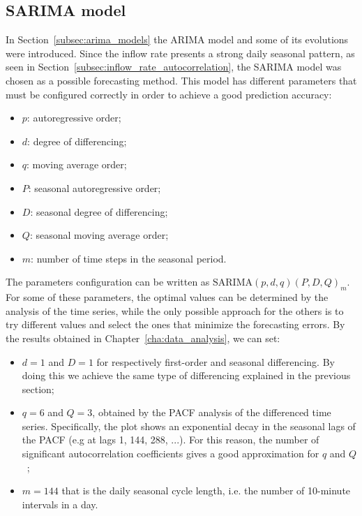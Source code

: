 \subsection{SARIMA model}
\label{subsec:sarima_model}
In Section~\ref{subsec:arima_models} the ARIMA model and some of its evolutions were introduced. Since the inflow rate presents a strong daily seasonal pattern, as seen in Section~\ref{subsec:inflow_rate_autocorrelation}, the SARIMA model was chosen as a possible forecasting method. This model has different parameters that must be configured correctly in order to achieve a good prediction accuracy:
\begin{itemize}
  \item \( p \): autoregressive order;
  \item \( d \): degree of differencing;
  \item \( q \): moving average order;
  \item \( P \): seasonal autoregressive order;
  \item \( D \): seasonal degree of differencing;
  \item \( Q \): seasonal moving average order;
  \item \( m \): number of time steps in the seasonal period.
\end{itemize}

The parameters configuration can be written as \( \text{SARIMA}(p,d,q)(P,D,Q)_m \). For some of these parameters, the optimal values can be determined by the analysis of the time series, while the only possible approach for the others is to try different values and select the ones that minimize the forecasting errors. By the results obtained in Chapter~\ref{cha:data_analysis}, we can set:
\begin{itemize}
  \item \( d = 1 \) and \( D = 1 \) for respectively first-order and seasonal differencing. By doing this we achieve the same type of differencing explained in the previous section;
  \item \( q = 6 \) and \( Q = 3 \), obtained by the PACF analysis of the differenced time series. Specifically, the plot shows an exponential decay in the seasonal lags of the PACF (e.g at lags 1, 144, 288, ...). For this reason, the number of significant autocorrelation coefficients gives a good approximation for \( q \) and \( Q \)~\cite{hyndman2018};
  \item \( m = 144 \) that is the daily seasonal cycle length, i.e. the number of 10-minute intervals in a day.
\end{itemize}

